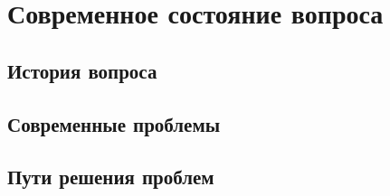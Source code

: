 \chapter{Современное состояние вопроса}
\section{История вопроса}
\section{Современные проблемы}
\section{Пути решения проблем}